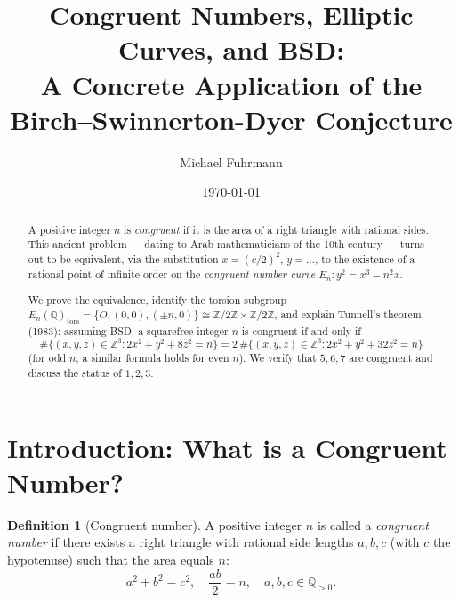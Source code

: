 \documentclass[12pt,a4paper]{amsart}
\theoremstyle{definition}
\newtheorem{definition}[theorem]{Definition}
\newcommand{\Z}{\mathbb{Z}}
\newcommand{\Q}{\mathbb{Q}}
\begin{document}

\title{Congruent Numbers, Elliptic Curves, and BSD:\\
       A Concrete Application of the Birch--Swinnerton-Dyer Conjecture}

\author{Michael Fuhrmann}
\address{Specialist Mathematics Project, Build 84}
\date{\today}

\begin{abstract}
A positive integer $n$ is \emph{congruent} if it is the area of a right triangle
with rational sides.  This ancient problem --- dating to Arab mathematicians
of the 10th century --- turns out to be equivalent, via the substitution
$x = (c/2)^2$, $y = \ldots$, to the existence of a rational point of infinite
order on the \emph{congruent number curve}
$E_n: y^2 = x^3 - n^2 x$.

We prove the equivalence, identify the torsion subgroup $E_n(\Q)_{\mathrm{tors}}
= \{O, (0,0), (\pm n, 0)\} \cong \Z/2\Z \times \Z/2\Z$,
and explain Tunnell's theorem (1983): assuming BSD, a squarefree integer $n$
is congruent if and only if
\[
  \#\{(x,y,z) \in \Z^3 : 2x^2 + y^2 + 8z^2 = n\}
  = 2\,\#\{(x,y,z) \in \Z^3 : 2x^2 + y^2 + 32z^2 = n\}
\]
(for odd $n$; a similar formula holds for even $n$).
We verify that $5, 6, 7$ are congruent and discuss the status of $1, 2, 3$.
\end{abstract}

\maketitle
\tableofcontents

\section{Introduction: What is a Congruent Number?}

\begin{definition}[Congruent number]
\label{def:congruent}
A positive integer $n$ is called a \emph{congruent number} if there exists
a right triangle with rational side lengths $a, b, c$ (with $c$ the hypotenuse)
such that the area equals $n$:
\[
  a^2 + b^2 = c^2, \quad \frac{ab}{2} = n, \quad a, b, c \in \Q_{>0}.
\]
\end{definition}
\end{document}
